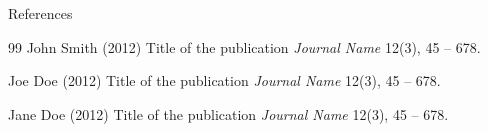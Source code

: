 \documentclass[aspectratio=169,xcolor=dvipsnames, t]{beamer} %
\begin{document}
\begin{frame}{References}
    \footnotesize{
        \begin{thebibliography}{99}
             John Smith (2012)
            \newblock Title of the publication
            \newblock \emph{Journal Name} 12(3), 45 -- 678.

             Joe Doe (2012)
            \newblock Title of the publication
            \newblock \emph{Journal Name} 12(3), 45 -- 678.

             Jane Doe (2012)
            \newblock Title of the publication
            \newblock \emph{Journal Name} 12(3), 45 -- 678.
        \end{thebibliography}
    }
\end{frame}


\makefinalpage
\end{document}
